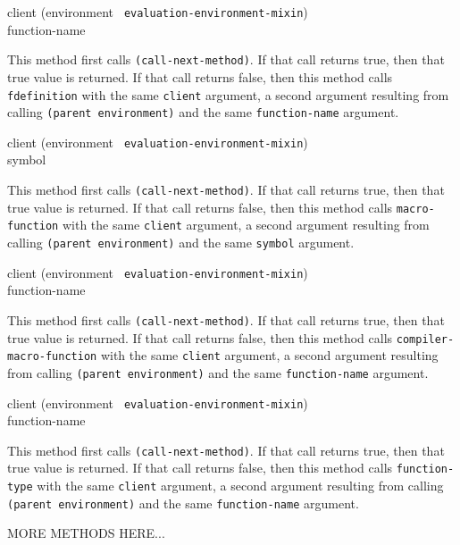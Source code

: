 {\small{} {client (environment {\tt
      evaluation-environment-mixin}) \\ function-name}
}

This method first calls \texttt{(call-next-method)}.  If that call
returns true, then that true value is returned.  If that call returns
false, then this method calls \texttt{fdefinition} with the same
\texttt{client} argument, a second argument resulting from calling
\texttt{(parent environment)} and the same \texttt{function-name}
argument.

{\small{} {client (environment {\tt
      evaluation-environment-mixin}) \\ symbol}
}

This method first calls \texttt{(call-next-method)}.  If that call
returns true, then that true value is returned.  If that call returns
false, then this method calls \texttt{macro-function} with the same
\texttt{client} argument, a second argument resulting from calling
\texttt{(parent environment)} and the same \texttt{symbol}
argument.

{\small{} {client (environment {\tt
      evaluation-environment-mixin}) \\ function-name}
}

This method first calls \texttt{(call-next-method)}.  If that call
returns true, then that true value is returned.  If that call returns
false, then this method calls \texttt{compiler-macro-function} with
the same \texttt{client} argument, a second argument resulting from
calling \texttt{(parent environment)} and the same
\texttt{function-name} argument.

{\small{} {client (environment {\tt
      evaluation-environment-mixin}) \\ function-name}
}

This method first calls \texttt{(call-next-method)}.  If that call
returns true, then that true value is returned.  If that call returns
false, then this method calls \texttt{function-type} with the same
\texttt{client} argument, a second argument resulting from calling
\texttt{(parent environment)} and the same \texttt{function-name}
argument.

MORE METHODS HERE...
